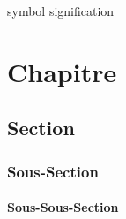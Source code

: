 \documentclass [memoire, letterpaper, oneside, fleqn,12pt]{thETS-utf8}
\begin{document}
\begin{listofsymbols}[3cm]
\item[symbol] signification
\end{listofsymbols}

\newpage
{}

\reversemarginpar %

\begin{introduction}

\end{introduction}

\chapter{Chapitre}
\section{Section}
\subsection{Sous-Section}
\subsubsection{Sous-Sous-Section}
%
%
%
%
%
%
%
%

\begin{conclusion}

\end{conclusion}

\begin{remerciements}

\end{remerciements}

\appendix
\multiannexe %
%


\renewcommand{\bibname}{RÉFÉRENCES BIBLIOGRAPHIQUES}

\end{document}

